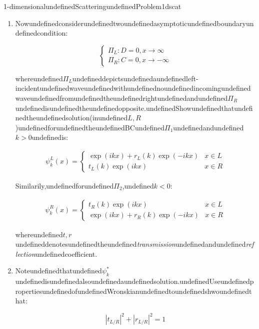 \begin{mystexercise}{1-dimensionalundefinedScatteringundefinedProblem}{1dscat}
\begin{enumerate}
\item Nowundefinedconsiderundefinedtwoundefinedasymptoticundefinedboundaryundefinedcondition:

\begin{equation}
\begin{cases}
\Pi_L: D=0, x\to \infty \\
\Pi_R: C=0, x\to -\infty
\end{cases}
\end{equation}


whereundefined$\Pi_L$undefineddepictsundefinedaundefinedleft-incidentundefinedwaveundefinedwithundefinednoundefinedincomingundefinedwaveundefinedfromundefinedtheundefinedrightundefinedandundefined$\Pi_R$undefinedisundefinedtheundefinedopposite.undefinedShowundefinedthatundefinedtheundefinedsolution(inundefined$L,R$)undefinedforundefinedtheundefinedBCundefined$\Pi_1$undefinedandundefined$k>0$undefinedis:

\begin{equation}
\begin{aligned}
\psi_k^L(x) = \begin{cases}
\exp(ikx)+ r_L(k)\exp(-ikx) & x\in L \\
t_L(k)\exp(ikx) & x\in R
\end{cases}
\end{aligned}
\end{equation}


Similarily,undefinedforundefined$\Pi_2$,undefined$k<0$:

\begin{equation}
\begin{aligned}
\psi_k^R(x)=\begin{cases}
t_R(k)\exp(ikx)& x\in L \\
\exp(ikx) + r_R(k)\exp(-ikx) & x\in R
\end{cases}
\end{aligned}
\end{equation}


whereundefined$t, r$undefineddenotesundefinedtheundefined\textit{transmission}undefinedandundefined\textit{reflection}undefinedcoefficient.


\item Noteundefinedthatundefined$\psi_k^*$undefinedisundefinedalsoundefinedaundefinedsolution.undefinedUseundefinedpropertiesundefinedofundefinedWronskianundefinedtoundefinedshwoundefinedthat:

\begin{equation}
|t_{L/R}|^2 + |r_{L/R}|^2=1
\end{equation}
\end{enumerate}

\end{mystexercise}
